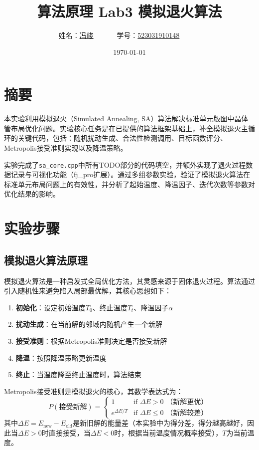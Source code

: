 \documentclass[UTF8,12pt,a4paper]{ctexart}
\title{算法原理 Lab3 模拟退火算法}
\author{
	姓名：\underline{冯峻}~~~~~~
	学号：\underline{523031910148}~~~~~~}
\date{\today}
\begin{document}
\fancyfoot[C]{\thepage}

\maketitle
\tableofcontents
\newpage
\section{摘要}

本实验利用模拟退火（Simulated Annealing, SA）算法解决标准单元版图中晶体管布局优化问题。实验核心任务是在已提供的算法框架基础上，补全模拟退火主循环的关键代码，包括：随机扰动生成、合法性检测调用、目标函数评分、Metropolis接受准则实现以及降温策略。

实验完成了\texttt{sa\_core.cpp}中所有TODO部分的代码填空，并额外实现了退火过程数据记录与可视化功能（fj\_pro扩展）。通过多组参数实验，验证了模拟退火算法在标准单元布局问题上的有效性，并分析了起始温度、降温因子、迭代次数等参数对优化结果的影响。

\newpage
\section{实验步骤}

\subsection{模拟退火算法原理}

模拟退火算法是一种启发式全局优化方法，其灵感来源于固体退火过程。算法通过引入随机性来避免陷入局部最优解，其核心思想如下：

\begin{enumerate}
	\item \textbf{初始化}：设定初始温度$T_0$、终止温度$T_t$、降温因子$\alpha$
	\item \textbf{扰动生成}：在当前解的邻域内随机产生一个新解
	\item \textbf{接受准则}：根据Metropolis准则决定是否接受新解
	\item \textbf{降温}：按照降温策略更新温度
	\item \textbf{终止}：当温度降至终止温度时，算法结束
\end{enumerate}

Metropolis接受准则是模拟退火的核心，其数学表达式为：
\[
P(\text{接受新解}) = 
\begin{cases}
1 & \text{if } \Delta E > 0 \text{ （新解更优）} \\
e^{\Delta E / T} & \text{if } \Delta E \leq 0 \text{ （新解较差）}
\end{cases}
\]
其中$\Delta E = E_{\text{new}} - E_{\text{old}}$是新旧解的能量差（本实验中为得分差，得分越高越好，因此当$\Delta E > 0$时直接接受，当$\Delta E < 0$时，根据当前温度情况概率接受），$T$为当前温度。
\end{document}
